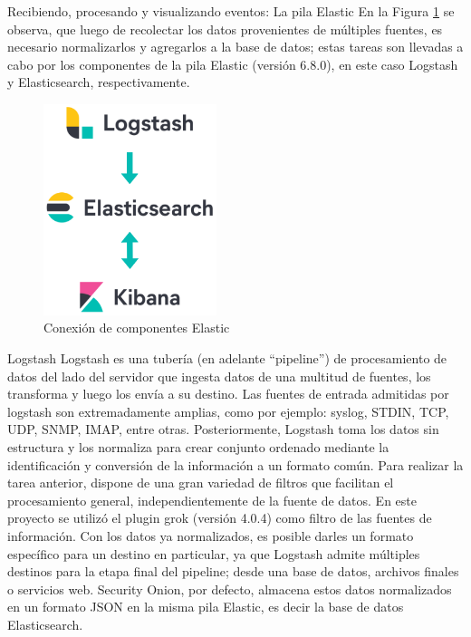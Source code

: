    \pagebreak
  
   \begin{section}{Recibiendo, procesando y visualizando eventos: La pila Elastic}
   En la Figura \ref{fig:figura_20_conexion_comp_elastic} se observa, que luego de recolectar los datos provenientes de múltiples fuentes, es necesario normalizarlos y agregarlos a la base de datos; estas tareas son llevadas a cabo por los componentes de la pila Elastic (versión 6.8.0), en este caso Logstash y Elasticsearch, respectivamente. 

   \begin{figure}[H]
        \centering
        \includegraphics[width=0.45\textwidth]{./descripcion_sonion_imagenes/figura_20_conexion_comp_elastic.png}
        \caption{Conexión de componentes Elastic}
        \label{fig:figura_20_conexion_comp_elastic}
    \end{figure}
        
   \end{section}
   \begin{subsection}{Logstash}
        Logstash es una tubería (en adelante “pipeline”) de procesamiento de datos del lado del servidor que ingesta datos de una multitud de fuentes, los transforma y luego los envía a su destino. Las fuentes de entrada admitidas por logstash son extremadamente amplias, como por ejemplo: syslog, STDIN, TCP, UDP, SNMP, IMAP, entre otras. Posteriormente, Logstash toma los datos sin estructura y los normaliza para crear conjunto ordenado mediante la identificación y conversión de la información a un formato común. Para realizar la tarea anterior, dispone de una gran variedad de filtros que facilitan el procesamiento general, independientemente de la fuente de datos. En este proyecto se utilizó el plugin grok (versión 4.0.4) \cite{grok} como filtro de las fuentes de información. Con los datos ya normalizados, es posible darles un formato específico para un destino en particular, ya que Logstash admite múltiples destinos para la etapa final del pipeline; desde una base de datos, archivos finales o servicios web. Security Onion, por defecto, almacena estos datos normalizados en un formato JSON en la misma pila Elastic, es decir la base de datos Elasticsearch.
   \end{subsection}
   
